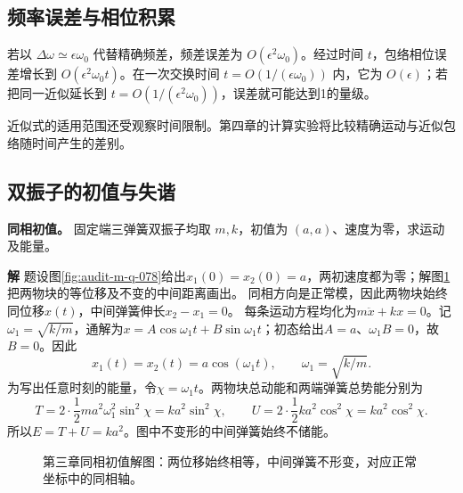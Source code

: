 \documentclass[11pt,openany,fontset=fandol]{ctexbook}
\theoremstyle{plain}\newtheorem{theorem}{定理}[chapter]\newtheorem{proposition}[theorem]{命题}
\theoremstyle{definition}\newtheorem{definition}{定义}[chapter]\newtheorem{example}{例}[chapter]
\theoremstyle{remark}\newtheorem*{remark}{说明}
\newcommand{\SolutionStart}{\par\nobreak\medskip\nobreak\noindent\textbf{解}\quad\ignorespaces}
\newenvironment{solution}{\SolutionStart}{\par\medskip}
\begin{document}
\subsection{频率误差与相位积累}
若以 $\Delta\omega\simeq\epsilon\omega_0$ 代替精确频差，频差误差为 $O(\epsilon^2\omega_0)$。经过时间 $t$，包络相位误差增长到 $O(\epsilon^2\omega_0t)$。在一次交换时间 $t=O(1/(\epsilon\omega_0))$ 内，它为 $O(\epsilon)$；若把同一近似延长到 $t=O(1/(\epsilon^2\omega_0))$，误差就可能达到1的量级。

近似式的适用范围还受观察时间限制。第四章的计算实验将比较精确运动与近似包络随时间产生的差别。

\subsection{双振子的初值与失谐}
\textbf{同相初值。} 固定端三弹簧双振子均取 $m,k$，初值为 $(a,a)$、速度为零，求运动及能量。


\begin{solution}
题设图\ref{fig:audit-m-q-078}给出$x_1(0)=x_2(0)=a$，两初速度都为零；解图\ref{fig:class-3-1}把两物块的等位移及不变的中间距离画出。
同相方向是正常模，因此两物块始终同位移$x(t)$，中间弹簧伸长$x_2-x_1=0$。
每条运动方程均化为$m\ddot x+kx=0$。记$\omega_1=\sqrt{k/m}$，通解为$x=A\cos\omega_1t+B\sin\omega_1t$；初态给出$A=a$、$\omega_1B=0$，故$B=0$。因此
\[
 x_1(t)=x_2(t)=a\cos(\omega_1t),\qquad \omega_1=\sqrt{k/m}.
\]
为写出任意时刻的能量，令$\chi=\omega_1t$。两物块总动能和两端弹簧总势能分别为
\[
 T=2\cdot\frac12m a^2\omega_1^2\sin^2\chi
   =ka^2\sin^2\chi,\qquad
 U=2\cdot\frac12ka^2\cos^2\chi=ka^2\cos^2\chi.
\]
所以$E=T+U=ka^2$。图中不变形的中间弹簧始终不储能。

\begin{figure}[H]
\centering
{}
\caption{第三章同相初值解图：两位移始终相等，中间弹簧不形变，对应正常坐标中的同相轴。}\label{fig:class-3-1}
\end{figure}
\end{solution}
\end{document}
